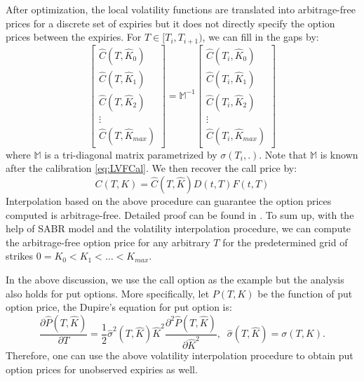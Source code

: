\documentclass[letterpaper,12pt,titlepage,oneside,final]{book}
\numberwithin{equation}{section}
\theoremstyle{definition}
\begin{document}
	After optimization,  the local volatility functions are translated into arbitrage-free prices for a discrete set of expiries but it does not directly specify the option prices between the expiries.  For $T \in [T_i,T_{i+1})$, we can fill in the gaps by:
	\[
	\begin{bmatrix}
	\widehat{C}(T,\widehat{K}_0)\\
	\widehat{C}(T,\widehat{K}_1)\\
	\widehat{C}(T,\widehat{K}_2)\\
	\vdots\\
	\widehat{C}(T,\widehat{K}_{max})
	\end{bmatrix}=\mathcal{\mathbb{M}}^{-1} \begin{bmatrix}
		\widehat{C}(T_{i},\widehat{K}_0)\\
		\widehat{C}(T_{i},\widehat{K}_1)\\
		\widehat{C}(T_{i},\widehat{K}_2)\\
		\vdots\\
		\widehat{C}(T_{i},\widehat{K}_{max})
		\end{bmatrix}
		\]
where $\mathcal{\mathbb{M}}$ is a tri-diagonal matrix parametrized by  $\sigma(T_i,.)$. Note that $\mathcal{\mathbb{M}}$ is known after the calibration \eqref{eq:LVFCal}.
We then recover the call price by:
\[
C(T,K)=\widehat{C}(T,\widehat{K}){D(t,T)F(t,T)}
\]
Interpolation based on the above procedure can guarantee the option prices computed is arbitrage-free. Detailed proof can be found in \cite{andreasen2010volatility}. To sum up, with the help of SABR model and the volatility interpolation procedure, we can compute the arbitrage-free option price for any arbitrary $T$ for the predetermined grid of strikes $0=K_0<K_1<\dots<K_{max}$. 

In the above discussion, we use the call option as the example but the analysis also holds for put options. More specifically, let $P(T,K)$	be the function of put option price, the Dupire's equation for put option is:
\[
\frac{\partial \widehat{P}(T,\widehat{K})}{\partial T}=\frac{1}{2} \widehat{\sigma}^2(T,\widehat{K}) \widehat{K}^2  \frac{\partial^2 \widehat{P}(T,\widehat{K})}{ \partial \widehat{K}^2},\;\; \widehat{\sigma}(T,\widehat{K})={\sigma}(T,K).
\]
Therefore, one can use the above volatility interpolation procedure to obtain put option prices for unobserved expiries as well. 
\end{document}
